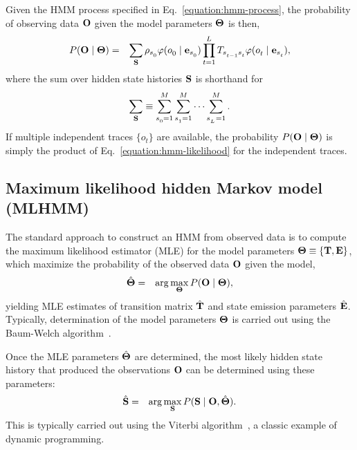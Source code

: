 \documentclass[aps,pre,twocolumn,superscriptaddress,nofootinbib,longbibliography]{revtex4-1}
\newcommand{\bfm}[1]{{\bf #1}}
\begin{document}
{Given the HMM process specified in Eq.~\ref{equation:hmm-process}, the probability of observing data $\bfm{O}$ given the model parameters $\bfm{\Theta}$ is then,
\begin{eqnarray}
P(\bfm{O} \mid \bfm{\Theta}) &=& \sum_{\bfm{S}}  \rho_{s^{}_{0}} \varphi(o^{}_{0} \mid \bfm{e}_{s^{}_{0}}) \prod_{t=1}^{L^{}} T_{s^{}_{t-1} s^{}_{t}} \varphi(o^{}_{t} \mid \bfm{e}_{s^{}_{t}}) \label{equation:hmm-likelihood} ,
\end{eqnarray}
where the sum over hidden state histories $\bfm{S}$ is shorthand for
\begin{eqnarray}
\sum_{\bfm{S}} \equiv \sum_{s^{}_{0}=1}^M \sum_{s^{}_{1}=1}^M \cdots \sum_{s^{}_{L^{}}=1}^M .
\end{eqnarray}
If multiple independent traces $\{o_t\}$ are available, the probability $P(\bfm{O} \mid \bfm{\Theta})$ is simply the product of Eq.~\ref{equation:hmm-likelihood} for the independent traces.

\subsection{Maximum likelihood hidden Markov model (MLHMM)}

The standard approach to construct an HMM from observed data is to compute the maximum likelihood estimator (MLE) for the model parameters $\bfm{\Theta} \equiv \{\bfm{T}, \bfm{E}\}$, which maximize the probability of the observed data $\bfm{O}$ given the model,
\begin{eqnarray}
\hat{\bfm{\Theta}} &=& \arg\max_\bfm{\Theta} P(\bfm{O} \mid \bfm{\Theta}) ,
\end{eqnarray}
yielding MLE estimates of transition matrix $\hat{\bfm{T}}$ and state emission parameters $\hat{\bfm{E}}$.
Typically, determination of the model parameters $\bfm{\Theta}$ is carried out using the Baum-Welch algorithm~\cite{baum:1970:ann-math-statist:baum-welch}.

Once the MLE parameters $\hat{\bfm{\Theta}}$ are determined, the most likely hidden state history that produced the observations $\bfm{O}$ can be determined using these parameters:
\begin{eqnarray}
\hat{\bfm{S}} &=& \arg\max_\bfm{S} P(\bfm{S} \mid \bfm{O}, \hat{\bfm{\Theta}}) .
\end{eqnarray}
This is typically carried out using the Viterbi algorithm~\cite{viterbi:1967:IEEE-trans-info-theory:viterbi-algorithm}, a classic example of dynamic programming.

}
\end{document}
